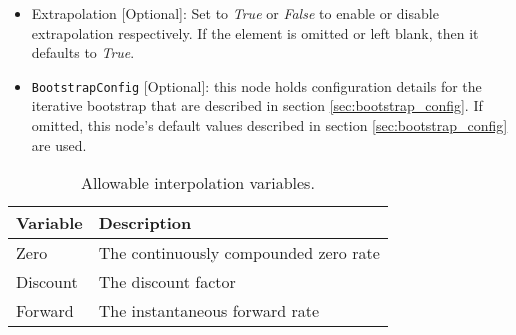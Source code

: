\begin{itemize}
\item Extrapolation [Optional]: Set to \emph{True} or \emph{False} to enable or disable extrapolation respectively. If
the element is omitted or left blank, then it defaults to \emph{True}.

\item \lstinline!BootstrapConfig! [Optional]: this node holds configuration details for the iterative bootstrap 
that are described in section \ref{sec:bootstrap_config}. If omitted, this node's default values described 
in section \ref{sec:bootstrap_config} are used.

\end{itemize}

\begin{table}[h]
\centering
  \begin{tabular}{|l|l|} 
    \hline
    {\bfseries Variable} & {\bfseries Description} \\
    \hline
    Zero & The continuously compounded zero rate \\ \hline
    Discount & The discount factor \\ \hline
    Forward & The instantaneous forward rate \\ \hline
  \end{tabular}
  \caption{Allowable interpolation variables.}
  \label{tab:allow_interp_variables}
\end{table}

